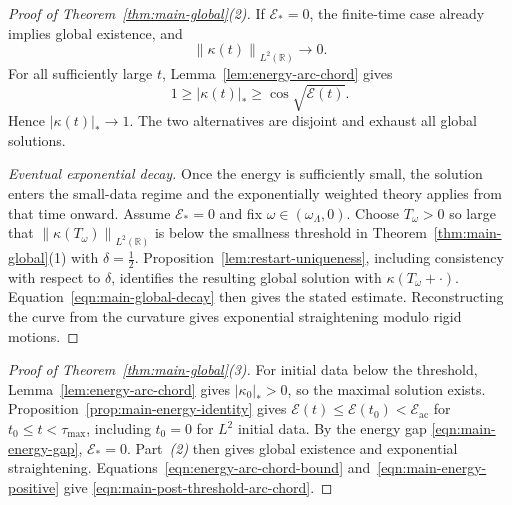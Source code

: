 \documentclass[11pt,reqno]{amsart}
\theoremstyle{plain}
\theoremstyle{definition}
\numberwithin{equation}{section}
\newcommand{\mc}[1]{\mathcal{#1}}
\newcommand{\abs}[1]{\left\lvert #1 \right\rvert}
\newcommand{\norm}[1]{\left\lVert #1 \right\rVert}
\newcommand{\R}{\mathbb{R}}
\begin{document}
\begin{proof}[Proof of Theorem~\ref{thm:main-global}(2)]
If $\mc E_*=0$, the finite-time case already implies global existence, and
\begin{equation}
    \norm{\kappa(t)}_{L^2(\R)}\longrightarrow0.
\end{equation}
For all sufficiently large $t$, Lemma~\ref{lem:energy-arc-chord} gives
\begin{equation}
    1\ge\abs{\kappa(t)}_*
    \ge\cos\sqrt{\mc E(t)}.
\end{equation}
Hence $\abs{\kappa(t)}_*\to1$. The two alternatives are disjoint and
exhaust all global solutions.

\emph{Eventual exponential decay.}
Once the energy is sufficiently small, the solution enters the
small-data regime and the exponentially weighted theory applies from
that time onward. Assume $\mc E_*=0$ and fix $\omega\in(\omega_\Lambda,0)$. Choose
$T_\omega>0$ so large that $\norm{\kappa(T_\omega)}_{L^2(\R)}$ is below
the smallness threshold in Theorem~\ref{thm:main-global}(1) with
$\delta=\frac12$. Proposition~\ref{lem:restart-uniqueness}, including
consistency with respect to $\delta$, identifies the resulting global
solution with $\kappa(T_\omega+\cdot)$. Equation~\eqref{eqn:main-global-decay}
then gives the stated estimate.
Reconstructing the curve from the curvature gives exponential straightening
modulo rigid motions.
\end{proof}

\begin{proof}[Proof of Theorem~\ref{thm:main-global}(3)]
For initial data below the threshold, Lemma~\ref{lem:energy-arc-chord}
gives $\abs{\kappa_0}_*>0$, so the maximal solution exists.
Proposition~\ref{prop:main-energy-identity} gives
$\mc E(t)\le\mc E(t_0)<\mc E_{\mathrm{ac}}$ for
$t_0\le t<\tau_{\mathrm{max}}$, including $t_0=0$ for $L^2$ initial data.
By the energy gap \eqref{eqn:main-energy-gap}, $\mc E_*=0$.
Part~\emph{(2)} then gives global existence and exponential straightening.
Equations~\eqref{eqn:energy-arc-chord-bound} and~\eqref{eqn:main-energy-positive} give
\eqref{eqn:main-post-threshold-arc-chord}.
\end{proof}
\end{document}
